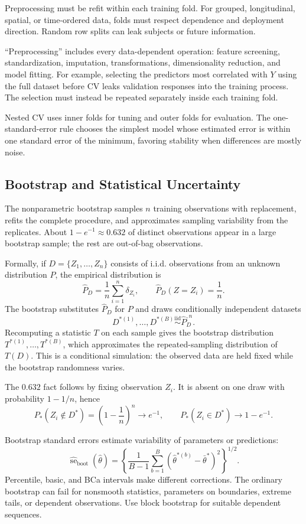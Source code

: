 \documentclass[12pt,oneside]{book}
\numberwithin{equation}{section}
\theoremstyle{definition}
\theoremstyle{plain}
\theoremstyle{remark}
\begin{document}
Preprocessing must be refit within each training fold. For grouped,
longitudinal, spatial, or time-ordered data, folds must respect dependence and
deployment direction. Random row splits can leak subjects or future
information.

``Preprocessing'' includes every data-dependent operation: feature screening,
standardization, imputation, transformations, dimensionality reduction, and
model fitting. For example, selecting the predictors most correlated with
$Y$ using the full dataset before CV leaks validation responses into the
training process. The selection must instead be repeated separately inside
each training fold.

Nested CV uses inner folds for tuning and outer folds for evaluation. The
one-standard-error rule chooses the simplest model whose estimated error is
within one standard error of the minimum, favoring stability when differences
are mostly noise.

\subsection{Bootstrap and Statistical Uncertainty}

The nonparametric bootstrap samples $n$ training observations with replacement,
refits the complete procedure, and approximates sampling variability from the
replicates. About $1-e^{-1}\approx0.632$ of distinct observations appear in a
large bootstrap sample; the rest are out-of-bag observations.

Formally, if $D=\{Z_1,\ldots,Z_n\}$ consists of i.i.d. observations from an
unknown distribution $P$, the empirical distribution is
\[
 \widehat P_D=\frac1n\sum_{i=1}^n\delta_{Z_i},
 \qquad \widehat P_D(Z=Z_i)=\frac1n.
\]
The bootstrap substitutes $\widehat P_D$ for $P$ and draws conditionally
independent datasets
\[
 D^{*(1)},\ldots,D^{*(B)}\overset{\mathrm{iid}}{\sim}\widehat P_D^{,n}.
\]
Recomputing a statistic $T$ on each sample gives the bootstrap distribution
$T^{*(1)},\ldots,T^{*(B)}$, which approximates the repeated-sampling
distribution of $T(D)$. This is a conditional simulation: the observed data
are held fixed while the bootstrap randomness varies.

The $0.632$ fact follows by fixing observation $Z_i$. It is absent on one draw
with probability $1-1/n$, hence
\[
 P_*(Z_i\notin D^*)=\left(1-\frac1n\right)^n\longrightarrow e^{-1},
 \qquad
 P_*(Z_i\in D^*)\longrightarrow1-e^{-1}.
\]

Bootstrap standard errors estimate variability of parameters or predictions:
\[
 \widehat{\operatorname{se}}_{\mathrm{boot}}(\widehat\theta)
 =\left\{\frac1{B-1}\sum_{b=1}^B
 (\widehat\theta^{*(b)}-\bar\theta^*)^2\right\}^{1/2}.
\]
Percentile, basic, and BCa intervals make different corrections. The ordinary
bootstrap can fail for nonsmooth statistics, parameters on boundaries,
extreme tails, or dependent observations. Use block bootstrap for suitable
dependent sequences.
\end{document}

